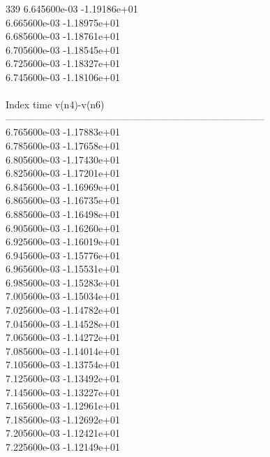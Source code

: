 339	6.645600e-03	-1.19186e+01	\\ 	6.665600e-03	-1.18975e+01	\\ 	6.685600e-03	-1.18761e+01	\\ 	6.705600e-03	-1.18545e+01	\\ 	6.725600e-03	-1.18327e+01	\\ 	6.745600e-03	-1.18106e+01	\\ \hline
\\ \hline
Index   time            v(n4)-v(n6)     \\ \hline
--------------------------------------------------------------------------------\\ 	6.765600e-03	-1.17883e+01	\\ 	6.785600e-03	-1.17658e+01	\\ 	6.805600e-03	-1.17430e+01	\\ 	6.825600e-03	-1.17201e+01	\\ 	6.845600e-03	-1.16969e+01	\\ 	6.865600e-03	-1.16735e+01	\\ 	6.885600e-03	-1.16498e+01	\\ 	6.905600e-03	-1.16260e+01	\\ 	6.925600e-03	-1.16019e+01	\\ 	6.945600e-03	-1.15776e+01	\\ 	6.965600e-03	-1.15531e+01	\\ 	6.985600e-03	-1.15283e+01	\\ 	7.005600e-03	-1.15034e+01	\\ 	7.025600e-03	-1.14782e+01	\\ 	7.045600e-03	-1.14528e+01	\\ 	7.065600e-03	-1.14272e+01	\\ 	7.085600e-03	-1.14014e+01	\\ 	7.105600e-03	-1.13754e+01	\\ 	7.125600e-03	-1.13492e+01	\\ 	7.145600e-03	-1.13227e+01	\\ 	7.165600e-03	-1.12961e+01	\\ 	7.185600e-03	-1.12692e+01	\\ 	7.205600e-03	-1.12421e+01	\\ 	7.225600e-03	-1.12149e+01	\\ \hline
